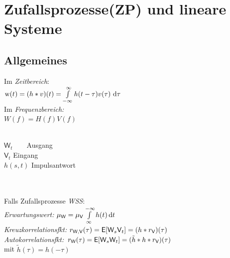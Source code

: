 \documentclass[german,color,6pt]{latex4ei/latex4ei_sheet}
\begin{document}
\section{Zufallsprozesse(ZP) und lineare Systeme}
\begin{sectionbox}
	\subsection{Allgemeines}
	Im \emph{Zeitbereich}:\\
	$\text{w}(t)  =  (h \ast v)(t) = \int\limits_{- \infty}^{\infty} h(t - \tau) v(\tau) \, \diff\tau$ \\
	Im \emph{Frequenzbereich:}\\
	$W(f) = H(f)V(f)$ \\ \\
	\parbox{3.8cm}{}
	\parbox{3.5cm}{$\textsf{W}_t$  \,\,\,\,\,\,\,\,  Ausgang\\
		$\textsf{V}_t$  \qquad Eingang\\
		$h(s,t)$  Impulsantwort}	\\ \\
	Falls Zufallsprozesse \emph{WSS}: \\
	\emph{Erwartungswert:} $\mu_{\textsf{W}} = \mu_{\textsf{V}} \int\limits_{\infty}^{-\infty} h(t) \diff t$\\
	\emph{Kreuzkorrelationsfkt:} $r_{\textsf{W},\textsf{V}}(\tau) = \operatorname{\textsf{E}} [\textsf{W}_s \textsf{V}_t] =  (h * r_{\textsf{V}})(\tau)$\\
	\emph{Autokorrelationsfkt:} $r_{\textsf{W}}(\tau) = \operatorname{\textsf{E}} [\textsf{W}_s \textsf{W}_t] = (\tilde h * h * r_{\textsf{V}})(\tau)$\\ 
	 mit $\tilde h (\tau) = h(-\tau)$
\end{sectionbox}
\end{document}
